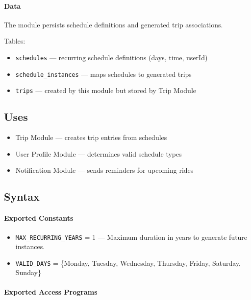 \paragraph{Data}
The module persists schedule definitions and generated trip associations.

Tables:
\begin{itemize}
    \item \texttt{schedules} --- recurring schedule definitions (days, time, userId)
    \item \texttt{schedule\_instances} --- maps schedules to generated trips
    \item \texttt{trips} --- created by this module but stored by Trip Module
\end{itemize}

\subsection{Uses}
\begin{itemize}
    \item Trip Module --- creates trip entries from schedules
    \item User Profile Module --- determines valid schedule types
    \item Notification Module --- sends reminders for upcoming rides
\end{itemize}

\subsection{Syntax}

\paragraph{Exported Constants}
\begin{itemize}
    \item \texttt{MAX\_RECURRING\_YEARS} = 1 --- Maximum duration in years to generate future instances.
    \item \texttt{VALID\_DAYS} = \{Monday, Tuesday, Wednesday, Thursday, Friday, Saturday, Sunday\}
\end{itemize}

\paragraph{Exported Access Programs}
\par\vspace{0.5em}

